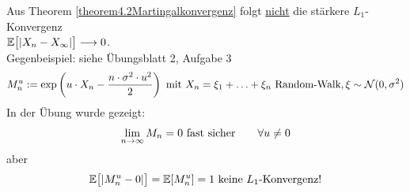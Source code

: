 \begin{bemerkung}
Aus Theorem \ref{theorem4.2Martingalkonvergenz} folgt \ul{nicht} die stärkere $L_1$-Konvergenz\\ $\E\big[|X_n-X_\infty|\big]\longrightarrow0$.\\
Gegenbeispiel: siehe Übungsblatt 2, Aufgabe 3
\begin{align*}
M_n^u:=\exp\left(u\cdot X_n-\frac{n\cdot\sigma^2\cdot u^2}{2}\right)\mit X_n=\xi_1+\ldots+\xi_n\text{ Random-Walk},\xi\sim\mathcal{N}(0,\sigma^2)
\end{align*}
In der Übung wurde gezeigt:
\begin{align*}
\limn M_n=0\text{ fast sicher}\qquad\forall u\neq0
\end{align*}
aber
\begin{align*}
\E\big[|M_n^u-0|\big]=\E[M_n^u]=1 \text{ keine $L_1$-Konvergenz!}
\end{align*}
\end{bemerkung}

